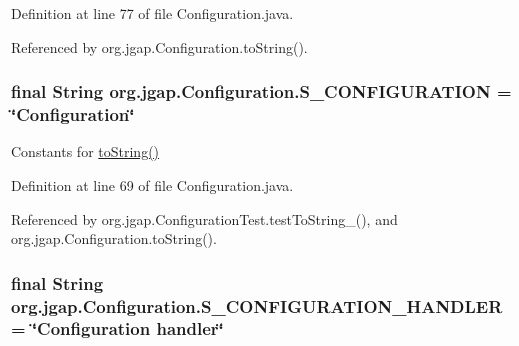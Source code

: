 Definition at line 77 of file Configuration.\-java.



Referenced by org.\-jgap.\-Configuration.\-to\-String().

\hypertarget{classorg_1_1jgap_1_1_configuration_a5377e73a9cbfbf4828f50131b5885311}{
\subsubsection[{S\-\_\-\-C\-O\-N\-F\-I\-G\-U\-R\-A\-T\-I\-O\-N}]{\setlength{\rightskip}{0pt plus 5cm}final String org.\-jgap.\-Configuration.\-S\-\_\-\-C\-O\-N\-F\-I\-G\-U\-R\-A\-T\-I\-O\-N = \char`\"{}Configuration\char`\"{}\hspace{0.3cm}{\ttfamily [static]}}}\label{classorg_1_1jgap_1_1_configuration_a5377e73a9cbfbf4828f50131b5885311}
Constants for \hyperlink{classorg_1_1jgap_1_1_configuration_ae2a41563013d4fafbe90a273f5e55e5b}{to\-String()} 

Definition at line 69 of file Configuration.\-java.



Referenced by org.\-jgap.\-Configuration\-Test.\-test\-To\-String\-\_(), and org.\-jgap.\-Configuration.\-to\-String().

\hypertarget{classorg_1_1jgap_1_1_configuration_a64ed6008cbf8376c630d5d9e14b8b951}{
\subsubsection[{S\-\_\-\-C\-O\-N\-F\-I\-G\-U\-R\-A\-T\-I\-O\-N\-\_\-\-H\-A\-N\-D\-L\-E\-R}]{\setlength{\rightskip}{0pt plus 5cm}final String org.\-jgap.\-Configuration.\-S\-\_\-\-C\-O\-N\-F\-I\-G\-U\-R\-A\-T\-I\-O\-N\-\_\-\-H\-A\-N\-D\-L\-E\-R = \char`\"{}Configuration handler\char`\"{}\hspace{0.3cm}{\ttfamily [static]}}}\label{classorg_1_1jgap_1_1_configuration_a64ed6008cbf8376c630d5d9e14b8b951}


